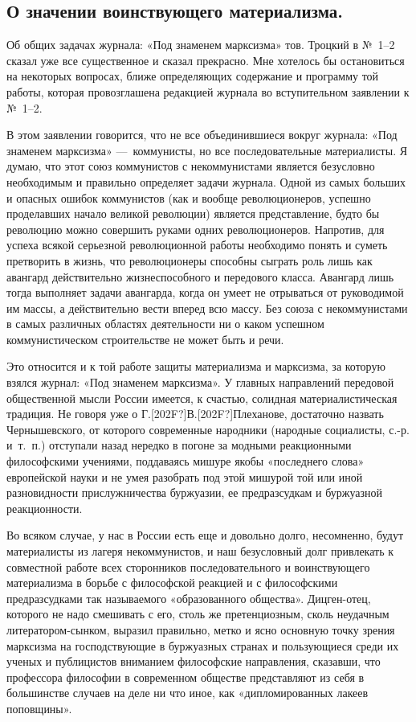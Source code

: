 \clearpage\subsection{О значении воинствующего материализма.}
Об общих задачах
журнала: «Под знаменем марксизма» тов. Троцкий в №~1–2
сказал уже все существенное и сказал прекрасно. Мне хотелось бы
остановиться на некоторых вопросах, ближе определяющих содержание и
программу той работы, которая провозглашена редакцией журнала во
вступительном заявлении к №~1–2.

В этом заявлении говорится, что не все объединившиеся вокруг журнала: «Под
знаменем марксизма» —~коммунисты, но все последовательные материалисты. Я
думаю, что этот союз коммунистов с некоммунистами является безусловно
необходимым и правильно определяет задачи журнала. Одной из самых больших и
опасных ошибок коммунистов (как и вообще революционеров, успешно
проделавших начало великой революции) является представление, будто бы
революцию можно совершить руками одних революционеров. Напротив, для успеха
всякой серьезной революционной работы необходимо понять и суметь претворить
в жизнь, что революционеры способны сыграть роль лишь как авангард
действительно жизнеспособного и передового класса. Авангард лишь тогда
выполняет задачи авангарда, когда он умеет не отрываться от руководимой им
массы, а действительно вести вперед всю массу. Без союза с некоммунистами в
самых различных областях деятельности ни о каком успешном коммунистическом
строительстве не может быть и речи.

Это относится и к той работе защиты материализма и марксизма, за которую
взялся журнал: «Под знаменем марксизма». У главных направлений передовой
общественной мысли России имеется, к счастью, солидная материалистическая
традиция. Не говоря уже о
Г.\textlatin{[202F?]}В.\textlatin{[202F?]}Плеханове, достаточно назвать
Чернышевского, от которого современные народники (народные социалисты,
с.-р. и~т.~п.) отступали назад нередко в погоне за модными реакционными
философскими учениями, поддаваясь мишуре якобы «последнего слова»
европейской науки и не умея разобрать под этой мишурой той или иной
разновидности прислужничества буржуазии, ее предразсудкам и буржуазной
реакционности.

Во всяком случае, у нас в России есть еще и довольно долго, несомненно,
будут материалисты из лагеря некоммунистов, и наш безусловный долг
привлекать к совместной работе всех сторонников последовательного и
воинствующего материализма в борьбе с философской реакцией и с философскими
предразсудками так называемого «образованного общества». Дицген-отец,
которого не надо смешивать с его, столь же претенциозным, сколь неудачным
литератором-сынком, выразил правильно, метко и ясно основную точку зрения
марксизма на господствующие в буржуазных странах и пользующиеся среди их
ученых и публицистов вниманием философские направления, сказавши, что
профессора философии в современном обществе представляют из себя в
большинстве случаев на деле ни что иное, как «дипломированных лакеев
поповщины».

